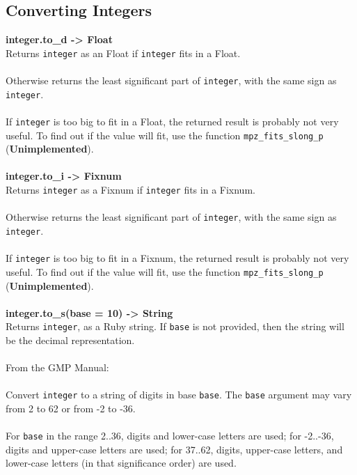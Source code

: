 \documentclass[pdftex,10pt]{article}
\begin{document}
\subsection{Converting Integers}

\large{\textbf{integer.to\_d -> Float}}\\
Returns \texttt{integer} as an Float if \texttt{integer} fits in a Float.\\
\\
Otherwise returns the least significant part of \texttt{integer}, with the same sign as
\texttt{integer}.\\
\\
If \texttt{integer} is too big to fit in a Float, the returned result is probably not
very useful. To find out if the value will fit, use the function
\texttt{mpz\_fits\_slong\_p} (\textbf{Unimplemented}).\\
\\
\large{\textbf{integer.to\_i -> Fixnum}}\\
Returns \texttt{integer} as a Fixnum if \texttt{integer} fits in a Fixnum.\\
\\
Otherwise returns the least significant part of \texttt{integer}, with the same sign as
\texttt{integer}.\\
\\
If \texttt{integer} is too big to fit in a Fixnum, the returned result is probably not
very useful. To find out if the value will fit, use the function
\texttt{mpz\_fits\_slong\_p} (\textbf{Unimplemented}).\\
\\
\large{\textbf{integer.to\_s(base = 10) -> String}}\\
Returns \texttt{integer}, as a Ruby string. If \texttt{base} is not provided, then the
string will be the decimal representation.\\
\\
From the GMP Manual:\\
\\
Convert \texttt{integer} to a string of digits in base \texttt{base}. The \texttt{base}
argument may vary from 2 to 62 or from -2 to -36.\\
\\
For \texttt{base} in the range 2..36, digits and lower-case letters are used; for
-2..-36, digits and upper-case letters are used; for 37..62, digits, upper-case letters,
and lower-case letters (in that significance order) are used.\\
\end{document}
